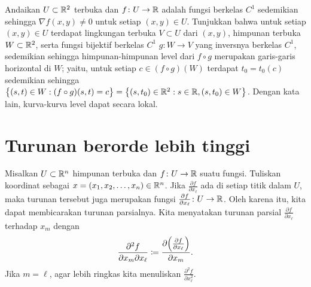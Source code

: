 \begin{exercise}
Andaikan $U \subset {\mathbb{R}}^2$ terbuka dan $f \colon U \to {\mathbb{R}}$ adalah
fungsi berkelas $C^1$ sedemikian
sehingga $\nabla f(x,y) \neq 0$ untuk setiap $(x,y) \in U$.
Tunjukkan bahwa untuk setiap $(x,y) \in U$ terdapat lingkungan terbuka $V \subset U$ dari $(x,y)$,
himpunan terbuka $W \subset {\mathbb{R}}^2$, serta fungsi bijektif berkelas $C^1$
$g \colon W \to V$ yang inversnya berkelas $C^1$, sedemikian sehingga
himpunan-himpunan level dari $f \circ g$ merupakan garis-garis horizontal di $W$; yaitu, untuk setiap
$c \in (f \circ g)(W)$ terdapat $t_0=t_0(c)$ sedemikian sehingga
$\bigl\{(s,t) \in W : (f \circ g)(s,t)=c\bigr\}
=\bigl\{ (s,t_0) \in {\mathbb{R}}^2 : s \in {\mathbb{R}}, (s,t_0) \in W \bigr\}$.
Dengan kata lain, kurva-kurva level dapat  secara lokal.
\end{exercise}


\sectionnewpage
\section{Turunan berorde lebih tinggi}
\label{sec:mvhighordders}


Misalkan $U \subset {\mathbb{R}}^n$ himpunan terbuka dan $f \colon U \to {\mathbb{R}}$ suatu fungsi.
Tuliskan koordinat sebagai $x = (x_1,x_2,\ldots,x_n) \in {\mathbb{R}}^n$.
Jika $\frac{\partial f}{\partial x_{\ell}}$ ada di setiap titik dalam $U$,
maka turunan tersebut juga merupakan fungsi $\frac{\partial f}{\partial x_{\ell}}
\colon U \to {\mathbb{R}}$.  Oleh karena itu, kita dapat membicarakan turunan
parsialnya.  Kita menyatakan 
turunan parsial $\frac{\partial f}{\partial x_{\ell}}$ terhadap
$x_m$ dengan
\begin{equation*}
\frac{\partial^2 f}{\partial x_m \partial x_{\ell}}
\coloneqq
\frac{\partial \Bigl( \frac{\partial f}{\partial x_{\ell}} \Bigr)}{\partial x_m} .
\end{equation*}
Jika $m={\ell}$, agar lebih ringkas kita menuliskan 
$\frac{\partial^2 f}{\partial x_{\ell}^2}$.

